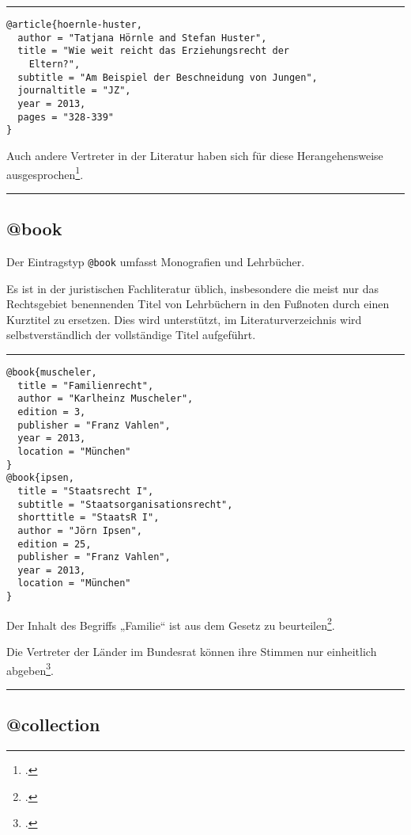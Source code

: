 \documentclass[11pt,a4paper,DIV=calc]{scrartcl}
\newenvironment{rubexample}{\par\vspace{\baselineskip}\hrule\par\begin{refsection}}{\end{refsection}\par\hrule\par\vspace{\baselineskip}}
\begin{document}
\begin{rubexample}
\begin{verbatim}
@article{hoernle-huster,
  author = "Tatjana Hörnle and Stefan Huster",
  title = "Wie weit reicht das Erziehungsrecht der
    Eltern?",
  subtitle = "Am Beispiel der Beschneidung von Jungen",
  journaltitle = "JZ",
  year = 2013,
  pages = "328-339"
}
\end{verbatim}

Auch andere Vertreter in der Literatur haben sich für diese
Herangehensweise ausgesprochen\footcite[330]{hoernle-huster}.

\printbibliography
\end{rubexample}

\subsection{@book}

Der Eintragstyp \verb+@book+ umfasst Monografien und Lehrbücher.

Es ist in der juristischen Fachliteratur üblich, insbesondere die
meist nur das Rechtsgebiet benennenden Titel von Lehrbüchern in den
Fußnoten durch einen Kurztitel zu ersetzen. Dies wird unterstützt, im
Literaturverzeichnis wird selbstverständlich der vollständige Titel
aufgeführt.

\begin{rubexample}

\begin{verbatim}
@book{muscheler,
  title = "Familienrecht",
  author = "Karlheinz Muscheler",
  edition = 3,
  publisher = "Franz Vahlen",
  year = 2013,
  location = "München"
}
@book{ipsen,
  title = "Staatsrecht I",
  subtitle = "Staatsorganisationsrecht",
  shorttitle = "StaatsR I",
  author = "Jörn Ipsen",
  edition = 25,
  publisher = "Franz Vahlen",
  year = 2013,
  location = "München"
}
\end{verbatim}

Der Inhalt des Begriffs „Familie“ ist aus dem Gesetz zu
beurteilen\footcite[\S\,1 Rnr. 3]{muscheler}.

Die Vertreter der Länder im Bundesrat können ihre Stimmen nur
einheitlich abgeben\footcite[\S\,7 Rnr. 343ff]{ipsen}.

\printbibliography
\end{rubexample}

\subsection{@collection}
\end{document}
